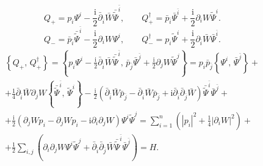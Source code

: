 \documentclass[a4paper, 14pt]{extarticle}
\begin{document}
\begin{sol}
\[
Q_+= p_i \Psi^i- \frac{\mathrm{i} }{2} \bar{\partial}_{\bar{i}}\bar{W}\bar{\tilde{\Psi}}^{\bar{i}},\qquad
Q_+^\dagger= \bar{p}_{\bar{i}}\bar{\Psi}^{\bar{i}}
+\frac{\mathrm{i} }{2} \partial_i W \tilde{\Psi}^i
.\] 
\[
	Q_-=\bar{p}_{\bar{i}}\bar{\tilde{\Psi}}^{\bar{i}}
	- \frac{\mathrm{i} }{2} \partial_i W \Psi^i,\qquad
	Q_-^\dagger=p_i \tilde{\Psi}^i+\frac{\mathrm{i} }{2}
	\partial_{\bar{i}} \bar{W} \bar{\Psi}^{\bar{i}}
.\] 
\begin{multline*}
\left\{ Q_+,\,Q_+^\dagger \right\} =
\left\{ p_i \Psi^i- \frac{\mathrm{i} }{2} \bar{\partial}_{\bar{i}}\bar{W}\bar{\tilde{\Psi}}^{\bar{i}},\,\bar{p}_{\bar{j}}\bar{\Psi}^{\bar{j}}
+\frac{\mathrm{i} }{2} \partial_j W \tilde{\Psi}^j \right\} 
=  p_i \bar{p}_{\bar{j}} \left\{ 
\Psi^i,\,\bar{\Psi}^{\bar{j}}\right\} +\\+
\frac{1}{4} \bar{\partial}_{\bar{i}} \bar{W}  \partial_j W
\left\{ \bar{ \tilde{\Psi}}^{\bar{i}},\,\tilde{\Psi}^i \right\} - \frac{\mathrm{i} }{2}\left( 
	\bar{\partial}_{\bar{i}} \bar{W}\bar{p}_{\bar{j}}-\bar{\partial}_{\bar{i}} \bar{W}\bar{p}_{\bar{j}}+\mathrm{i} \bar{\partial}_{\bar{i}}\bar{\partial}_{\bar{j}}\bar{W}\right) 
\bar{\tilde{\Psi}}^{\bar{i}}\bar{\Psi}^{\bar{j}}+\\+
\frac{\mathrm{i} }{2} \left( \partial_jWp_i- \partial_jWp_i -\mathrm{i} \partial_i \partial_j W\right)\Psi^i \tilde{\Psi}^j=
\sum_{i=1}^{n} \left(\left| p_i \right| ^2+\frac{1}{4}
\left| \partial_iW \right| ^2\right)+\\+
\frac{1}{2} \sum_{i,j}^{} \left( 
\partial_i \partial_j W \Psi^i \tilde{\Psi}^j+\bar{\partial}_{\bar{i}}\bar{\partial}_{\bar{j}}\bar{W}\bar{\tilde{\Psi}}^{\bar{i}}\bar{\Psi}^{\bar{j}}
\right) =H
.\end{multline*} 
\end{sol}
\end{document}
